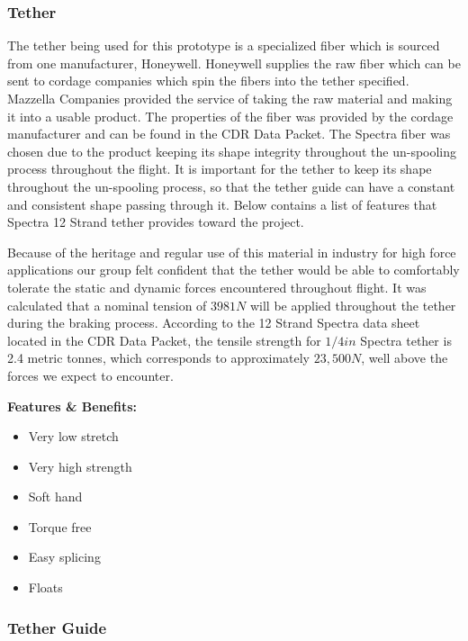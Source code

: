 
\subsubsection{Tether}

\indent\indent The tether being used for this prototype is a specialized fiber which is sourced from one manufacturer, Honeywell. Honeywell supplies the raw fiber which can be sent to cordage companies which spin the fibers into the tether specified. Mazzella Companies provided the service of taking the raw material and making it into a usable product. The properties of the fiber was provided by the cordage manufacturer and can be found in the CDR Data Packet. The Spectra fiber was chosen due to the product keeping its shape integrity throughout the un-spooling process throughout the flight. It is important for the tether to keep its shape throughout the un-spooling process, so that the tether guide can have a constant and consistent shape passing through it. Below contains a list of features that Spectra 12 Strand tether provides toward the project.

\indent\indent Because of the heritage and regular use of this material in industry for high force applications our group felt confident that the tether would be able to comfortably tolerate the static and dynamic forces encountered throughout flight. It was calculated that a nominal tension of $3981 N$ will be applied throughout the tether during the braking process. According to the 12 Strand Spectra data sheet located in the CDR Data Packet, the tensile strength for $1/4 in$ Spectra tether is 2.4 metric tonnes, which corresponds to approximately $23,500 N$, well above the forces we expect to encounter. 

\textbf{Features \& Benefits:}

\begin{itemize}[noitemsep]
  \item Very low stretch
  \item Very high strength
  \item Soft hand
  \item Torque free
  \item Easy splicing
  \item Floats
\end{itemize}


\subsubsection{Tether Guide}

